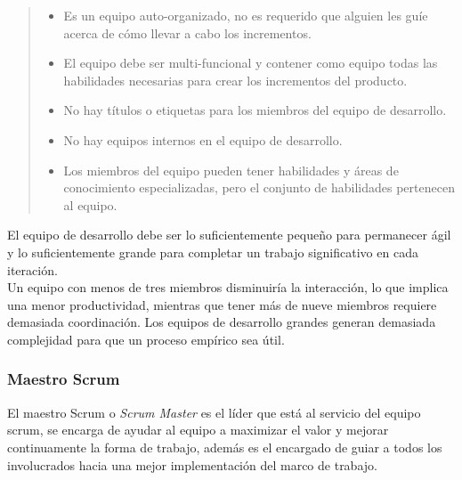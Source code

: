     \begin{quote}
    \begin{itemize}
    \item Es un equipo auto-organizado, no es requerido que alguien les guíe
          acerca de cómo llevar a cabo los incrementos.

    \item El equipo debe ser multi-funcional y contener como equipo todas las
          habilidades necesarias para crear los incrementos del producto.

    \item No hay títulos o etiquetas para los miembros del equipo de desarrollo.

    \item No hay equipos internos en el equipo de desarrollo.

    \item Los miembros del equipo pueden tener habilidades y áreas de conocimiento
          especializadas, pero el conjunto de habilidades pertenecen al equipo.
    \end{itemize}
    \end{quote}

 \noindent El equipo de desarrollo debe ser lo suficientemente pequeño para permanecer ágil y lo
 suficientemente grande para completar un trabajo significativo en cada iteración.\\

 \noindent Un equipo con menos de tres miembros disminuiría la interacción, lo que implica una
 menor productividad, mientras que tener más de nueve miembros requiere demasiada coordinación.
 Los equipos de desarrollo grandes generan demasiada complejidad para que un proceso empírico
 sea útil.

\clearpage

\subsubsection{Maestro Scrum}

 El maestro Scrum o {\it Scrum Master} es el líder que está al servicio del equipo 
 scrum, se encarga de ayudar al equipo a maximizar el valor y mejorar continuamente 
 la forma de trabajo, además es el encargado de guiar a todos los involucrados hacia
 una mejor implementación del marco de trabajo.

